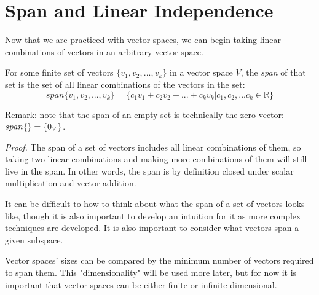 \chapter{Span and Linear Independence}

Now that we are practiced with vector spaces, we can begin taking linear combinations of vectors in an arbitrary vector space.

 {
    For some finite set of vectors $\{v_1, v_2, ... , v_k\}$ in a vector space $V$, the \textit{span} of that set is the set of 
    all linear combinations of the vectors in the set: \newline 
    \[span\{v_1, v_2, ... , v_k\} = \{c_1v_1 + c_2v_2 + ... + c_kv_k | c_1, c_2, ... c_k \in \mathbb{R}\}\]
}

Remark: note that the span of an empty set is technically the zero vector: $span\{\empty\} = \{0_V\}$.


\textit{Proof.} The span of a set of vectors includes all linear combinations of them, so taking two linear combinations and 
making more combinations of them will still live in the span. In other words, the span is by definition closed under scalar
multiplication and vector addition.


It can be difficult to how to think about what the span of a set of vectors looks like, though it is also important to develop
an intuition for it as more complex techniques are developed. It is also important to consider what vectors span a given subspace.


Vector spaces' sizes can be compared by the minimum number of vectors required to span them. This "dimensionality" will be used more
later, but for now it is important that vector spaces can be either finite or infinite dimensional.


